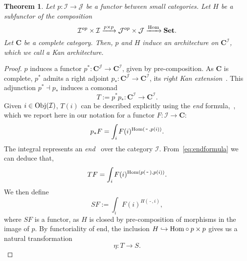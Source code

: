 \documentclass[12pt]{article}
\newtheorem{theorem}{Theorem}
\newcommand{\Hom}{{\textnormal{Hom}}}
\newcommand{\Obj}{{\textnormal{Obj}}}
\newcommand{\Set}{{\mathbf{Set}}}
\newcommand{\Cat}{{\mathbf{C}}}
\newcommand{\ICat}{{\mathcal{I}}}
\newcommand{\JCat}{{\mathcal{J}}}
\newcommand{\anon}{{\,\mbox{-}\,}}
\begin{document}
\begin{theorem}\label{thm:kan_architecture}
    Let $p\colon \ICat \rightarrow \JCat$ be a functor between small categories. Let $H$ be a subfunctor of the composition
    \begin{equation*}
        \ICat^{op} \times \ICat \xrightarrow{p \times p}
        \JCat^{op} \times \JCat \xrightarrow{\Hom} \Set.
    \end{equation*}
    Let $\Cat$ be a complete category. Then, $p$ and $H$ induce an architecture on $\Cat^\ICat$, which we call a {\em Kan architecture}.
\end{theorem}

\begin{proof}
    $p$ induces a functor $p^* \colon \Cat^\JCat \rightarrow \Cat^\ICat$, given by pre-composition. As $\Cat$ is complete, $p^*$ admits a right adjoint $p_* \colon \Cat^\JCat \rightarrow \Cat^\ICat$, its {\em right Kan extension}~\cite[Chapt.~X]{mac2013categories}. This adjunction $p^* \dashv p_*$ induces a comonad
    \begin{equation*}
        T := p^*p_* \colon \Cat^\ICat \rightarrow \Cat^\ICat.
    \end{equation*}
    Given $i \in \Obj(\ICat)$, $T(i)$ can be described explicitly using the {\em end} formula,~\cite[Eq.~X.4.3]{mac2013categories}, which we report here in our notation for a functor $F \colon \ICat \rightarrow \Cat$:
    \begin{equation}\label{eq:endformula}
        p_* F = \int_i F(i)^{\Hom(\anon, p(i))}.
    \end{equation}
    The integral represents an {\em end}~\cite[Sect.~IX.5]{mac2013categories} over the category $\ICat$. From~\cref{eq:endformula} we can deduce that,
    \begin{equation}\label{eq:comonad_endformula}
        T F = \int_i F(i)^{\Hom(p(\anon), p(i))}.
    \end{equation}
    We then define
    \begin{equation}\label{eq:functor_endformula}
        S F := \int_i F(i)^{H(\anon, i)},
    \end{equation}
    where $S F$ is a functor, as $H$ is closed by pre-composition of morphisms in the image of $p$. By functoriality of end, the inclusion $H \hookrightarrow \Hom \circ p \times p$ gives us a natural transformation
    \begin{equation*}
        \eta \colon T \rightarrow S.
    \end{equation*}
\end{proof}
\end{document}
